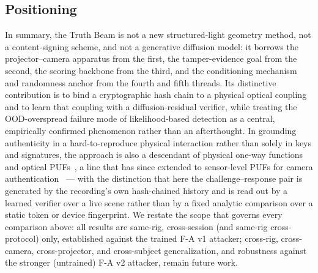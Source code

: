 \subsection{Positioning}
In summary, the Truth Beam is not a new structured-light geometry method, not a content-signing scheme, and not a generative diffusion model: it borrows the projector--camera apparatus from the first, the tamper-evidence goal from the second, the scoring backbone from the third, and the conditioning mechanism and randomness anchor from the fourth and fifth threads. Its distinctive contribution is to bind a cryptographic hash chain to a physical optical coupling and to learn that coupling with a diffusion-residual verifier, while treating the OOD-overspread failure mode of likelihood-based detection \cite{nalisnick2019} as a central, empirically confirmed phenomenon rather than an afterthought. In grounding authenticity in a hard-to-reproduce physical interaction rather than solely in keys and signatures, the approach is also a descendant of physical one-way functions and optical PUFs~\cite{pappu2002}, a line that has since extended to sensor-level PUFs for camera authentication~\cite{zheng2020edpuf} --- with the distinction that here the challenge--response pair is generated by the recording's own hash-chained history and is read out by a learned verifier over a live scene rather than by a fixed analytic comparison over a static token or device fingerprint. We restate the scope that governs every comparison above: all results are same-rig, cross-session (and same-rig cross-protocol) only, established against the trained F-A v1 attacker; cross-rig, cross-camera, cross-projector, and cross-subject generalization, and robustness against the stronger (untrained) F-A v2 attacker, remain future work.
